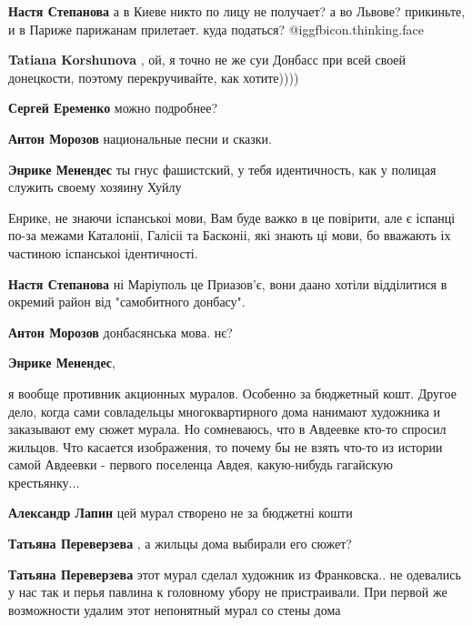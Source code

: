 \begin{itemize}
\begin{itemize}
\textbf{Настя Степанова} а в Киеве никто по лицу не получает? а во Львове? прикиньте, и в Париже парижанам прилетает. куда податься? @igg{fbicon.thinking.face} 

\textbf{Tatiana Korshunova} , ой, я точно не же суи Донбасс при всей своей донецкости, поэтому перекручивайте, как хотите))))

\textbf{Сергей Еременко} можно подробнее?

\textbf{Антон Морозов} национальные песни и сказки.

\textbf{Энрике Менендес} ты гнус фашистский, у тебя идентичность, как у полицая служить своему хозяину Хуйлу


Енрике, не знаючи іспанськоі мови, Вам буде важко в це повірити, але є іспанці
по-за межами Каталоніі, Галісіі та Басконіі, які знають ці мови, бо вважають іх
частиною іспанськоі ідентичності.

\textbf{Настя Степанова} ні Маріуполь це Приазов'є, вони даано хотіли відділитися в окремий район від "самобитного донбасу".

\textbf{Антон Морозов} донбасянська мова. нє?

\end{itemize} %

\textbf{Энрике Менендес}, 

я вообще противник акционных муралов. Особенно за бюджетный кошт. Другое дело,
когда сами совладельцы многоквартирного дома нанимают художника и заказывают
ему сюжет мурала. Но сомневаюсь, что в Авдеевке кто-то спросил жильцов. Что
касается изображения, то почему бы не взять что-то из истории самой Авдеевки -
первого поселенца Авдея, какую-нибудь гагайскую крестьянку...

\begin{itemize} %
\textbf{Александр Лапин} цей мурал створено не за бюджетні кошти

\textbf{Татьяна Переверзева} , а жильцы дома выбирали его сюжет?

\textbf{Татьяна Переверзева} этот мурал сделал художник из Франковска.. не одевались у нас так и перья павлина к головному убору не пристраивали. При первой же возможности удалим этот непонятный мурал со стены дома


\end{itemize}
\end{itemize}
